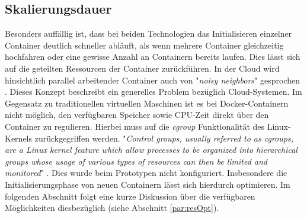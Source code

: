 \subsection{Skalierungsdauer}
\label{ss:skalierungsdauer}
Besonders auffällig ist, dass bei beiden Technologien das Initialisieren einzelner Container deutlich schneller abläuft, als wenn mehrere Container gleichzeitig hochfahren oder eine gewisse Anzahl an Containern bereits laufen. Dies lässt sich auf die geteilten Ressourcen der Container zurückführen. In der Cloud wird hinsichtlich parallel arbeitender Container auch von "\emph{noisy neighbors}" gesprochen \cite[Seite~67 ff.]{oreilly-docker}. Dieses Konzept beschreibt ein generelles Problem bezüglich Cloud-Systemen. Im Gegensatz zu traditionellen virtuellen Maschinen ist es bei Docker-Containern nicht möglich, den verfügbaren Speicher sowie CPU-Zeit direkt über den Container zu regulieren. Hierbei muss auf die \emph{cgroup} Funktionalität des Linux-Kernels zurückgegriffen werden. "\emph{Control groups, usually referred to as cgroups, are a Linux kernel feature which allow processes to be organized into hierarchical groups whose usage of various types of resources can then be limited and monitored}" \cite{man-cgroups}. Dies wurde beim Prototypen nicht konfiguriert. Insbesondere die Initialisierungsphase von neuen Containern lässt sich hierdurch optimieren. Im folgenden Abschnitt folgt eine kurze Diskussion über die verfügbaren Möglichkeiten diesbezüglich (siehe Abschnitt \ref{par:resOpt}).

